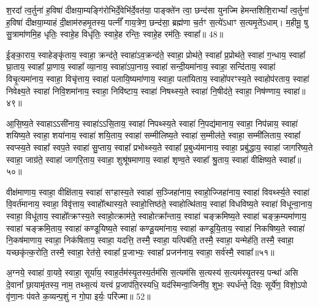 श॒रदा᳚ त्व॒र्तुना॑ ह॒विषा॑ दीक्षया॒म्यङ्गि॑रोभिर्दे॒वेभि॑र्दे॒वत॑या॒ पाङ्क्ते॑न त्वा॒ छन्द॑सा युनज्मि हेमन्तशिशि॒रा\-भ्यां᳚ त्व॒र्तुना॑ ह॒विषा॑ दीक्षया॒म्याहं दी॒क्षाम॑रुहमृ॒तस्य॒ पत्नीं᳚ गाय॒त्रेण॒ छन्द॑सा॒ ब्रह्म॑णा च॒र्तꣳ स॒त्ये॑\-ऽधाꣳ स॒त्यमृ॒ते॑\-ऽधाम्। म॒हीमू॒ षु सु॒त्रामा॑णमि॒ह धृतिः॒ स्वाहे॒ह विधृ॑तिः॒ स्वाहे॒ह रन्तिः॒ स्वाहे॒ह रम॑तिः॒ स्वाहा᳚॥ 48॥

{\anuvakamend[{}]}

ई॒ङ्का॒राय॒ स्वाहेङ्कृ॑ताय॒ स्वाहा॒ क्रन्द॑ते॒ स्वाहा॑\-ऽव॒क्रन्द॑ते॒ स्वाहा॒ प्रोथ॑ते॒ स्वाहा᳚ प्र॒प्रोथ॑ते॒ स्वाहा॑ ग॒न्धाय॒ स्वाहा᳚ घ्रा॒ताय॒ स्वाहा᳚ प्रा॒णाय॒ स्वाहा᳚ व्या॒नाय॒ स्वाहा॑\-ऽपा॒नाय॒ स्वाहा॑ सन्दी॒यमा॑नाय॒ स्वाहा॒ सन्दि॑ताय॒ स्वाहा॑ विचृ॒त्यमा॑नाय॒ स्वाहा॒ विचृ॑त्ताय॒ स्वाहा॑ पलायि॒ष्यमा॑णाय॒ स्वाहा॒ पला॑यिताय॒ स्वाहो॑परꣳस्य॒ते स्वाहोप॑रताय॒ स्वाहा॑ निवेक्ष्य॒ते स्वाहा॑ निवि॒शमा॑नाय॒ स्वाहा॒ निवि॑ष्टाय॒ स्वाहा॑ निषथ्स्य॒ते स्वाहा॑ नि॒षीद॑ते॒ स्वाहा॒ निष॑ण्णाय॒ स्वाहा॑॥४९॥



आ॒सि॒ष्य॒ते स्वाहा\-ऽ\-ऽसी॑नाय॒ स्वाहा॑\-ऽ\-ऽसि॒ताय॒ स्वाहा॑ निपथ्स्य॒ते स्वाहा॑ नि॒पद्य॑मानाय॒ स्वाहा॒ निप॑न्नाय॒ स्वाहा॑ शयिष्य॒ते स्वाहा॒ शया॑नाय॒ स्वाहा॑ शयि॒ताय॒ स्वाहा॑ सम्मीलिष्य॒ते स्वाहा॑ स॒म्मील॑ते॒ स्वाहा॒ सम्मी॑लिताय॒ स्वाहा᳚ स्वप्स्य॒ते स्वाहा᳚ स्वप॒ते स्वाहा॑ सु॒प्ताय॒ स्वाहा᳚ प्रभोथ्स्य॒ते स्वाहा᳚ प्र॒बुध्य॑मानाय॒ स्वाहा॒ प्रबु॑द्धाय॒ स्वाहा॑ जागरिष्य॒ते स्वाहा॒ जाग्र॑ते॒ स्वाहा॑ जागरि॒ताय॒ स्वाहा॒ शुश्रू॑षमाणाय॒ स्वाहा॑ शृण्व॒ते स्वाहा᳚ श्रु॒ताय॒ स्वाहा॑ वीक्षिष्य॒ते स्वाहा᳚॥५०॥

वीक्ष॑माणाय॒ स्वाहा॒ वीक्षि॑ताय॒ स्वाहा॑ सꣳहास्य॒ते स्वाहा॑ स॒ञ्जिहा॑नाय॒ स्वाहो॒ज्जिहा॑नाय॒ स्वाहा॑ विवर्थ्स्य॒ते स्वाहा॑ वि॒वर्त॑मानाय॒ स्वाहा॒ विवृ॑त्ताय॒ स्वाहो᳚त्थास्य॒ते स्वाहो॒त्तिष्ठ॑ते॒ स्वाहोत्थि॑ताय॒ स्वाहा॑ विधविष्य॒ते स्वाहा॑ विधून्वा॒नाय॒ स्वाहा॒ विधू॑ताय॒ स्वाहो᳚त्क्रꣳस्य॒ते स्वाहो॒त्क्राम॑ते॒ स्वाहोत्क्रा᳚न्ताय॒ स्वाहा॑ चङ्क्रमिष्य॒ते स्वाहा॑ चङ्क्र॒म्यमा॑णाय॒ स्वाहा॑ चङ्क्रमि॒ताय॒ स्वाहा॑ कण्डूयिष्य॒ते स्वाहा॑ कण्डू॒यमा॑नाय॒ स्वाहा॑ कण्डूयि॒ताय॒ स्वाहा॑ निकषिष्य॒ते स्वाहा॑ नि॒कष॑माणाय॒ स्वाहा॒ निक॑षिताय॒ स्वाहा॒ यदत्ति॒ तस्मै॒ स्वाहा॒ यत्पिब॑ति॒ तस्मै॒ स्वाहा॒ यन्मेह॑ति॒ तस्मै॒ स्वाहा॒ यच्छकृ॑त्क॒रोति॒ तस्मै॒ स्वाहा॒ रेत॑से॒ स्वाहा᳚ प्र॒जाभ्यः॒ स्वाहा᳚ प्रजन॑नाय॒ स्वाहा॒ सर्व॑स्मै॒ स्वाहा᳚॥५१॥

{\anuvakamend[{}]}

अ॒ग्नये॒ स्वाहा॑ वा॒यवे॒ स्वाहा॒ सूर्या॑य॒ स्वाह॒र्तम॑स्यृ॒तस्य॒र्तम॑सि स॒त्यम॑सि स॒त्यस्य॑ स॒त्यम॑स्यृ॒तस्य॒ पन्था॑ असि दे॒वानां᳚ छा॒यामृ॑तस्य॒ नाम॒ तथ्स॒त्यं यत्त्वं प्र॒जाप॑ति॒रस्यधि॒ यद॑स्मिन्वा॒जिनी॑व॒ शुभः॒ स्पर्ध॑न्ते॒ दिवः॒ सूर्ये॑ण॒ विशो॒\-ऽपो वृ॑णा॒नः प॑वते क॒व्यन्प॒शुं न गो॒पा इर्यः॒ परि॑ज्मा॥ 52॥

